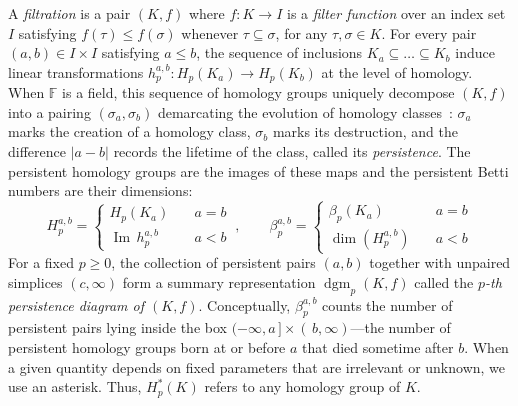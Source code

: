 \documentclass[pdflatex,sn-mathphys-num]{sn-jnl}
\begin{document}
A \emph{filtration} is a pair \((K,f)\) where \(f:K \rightarrow I\) is a \emph{filter function} over an index set \(I\) satisfying \(f(\tau) \leq f(\sigma)\) whenever \(\tau \subseteq \sigma\), for any \(\tau,\sigma \in K\). For every pair \((a,b) \in I \times I\) satisfying \(a \leq b\), the sequence of inclusions \(K_{a} \subseteq \ldots \subseteq K_{b}\) induce linear transformations \(h_{p}^{a,b}:H_{p}\left( K_{a} \right) \rightarrow H_{p}\left( K_{b} \right)\) at the level of homology. When \(\mathbb{F}\) is a field, this sequence of homology groups uniquely decompose \((K,f)\) into a pairing \(\left( \sigma_{a},\sigma_{b} \right)\) demarcating the evolution of homology classes~\cite{zomorodian2004computing}: \(\sigma_{a}\) marks the creation of a homology class, \(\sigma_{b}\) marks its destruction, and the difference \(\left| {a - b} \right|\) records the lifetime of the class, called its \emph{persistence}. The persistent homology groups are the images of these maps and the persistent Betti numbers are their dimensions:
\[\label{eq:pers_homology}
H_{p}^{a,b} = \begin{cases}
	H_{p}\left( K_{a} \right) & \quad a = b \\
	\operatorname{Im}\, h_{p}^{a,b} & \quad a < b
\end{cases}\:,
\quad\quad
\beta_{p}^{a,b} = \begin{cases}
	\beta_{p}\left( K_{a} \right) & \quad a = b \\
	\dim \left( H_{p}^{a,b} \right)  & \quad a < b
\end{cases}
\]
\noindent For a fixed \(p \geq 0\), the collection of persistent pairs \((a,b)\) together with unpaired simplices \((c,\infty)\) form a summary representation \(\operatorname{dgm}_{p}(K,f)\) called the \emph{\(p\)-th persistence diagram of \((K,f)\)}. Conceptually, \(\beta_{p}^{a,b}\) counts the number of persistent pairs lying inside the box \(( - \infty,a\,] \times (\, b,\infty)\)---the number of persistent homology groups born at or before \(a\) that died sometime after \(b\). When a given quantity depends on fixed parameters that are irrelevant or unknown, we use an asterisk. Thus, \(H_{p}^{\ast}(K)\) refers to any homology group of \(K\).
\end{document}
